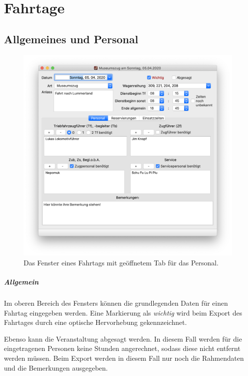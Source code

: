 \chapter{Fahrtage}\label{einsatz:fahrtag}
\section{Allgemeines und Personal}
\begin{figure}[!h]
	\includegraphics[width=\textwidth]{img/fahrtag_personal}
	\caption{Das Fenster eines Fahrtags mit geöffnetem Tab für das Personal.}
	\label{fig:einsatz:fahrtag:personal}
\end{figure}
\paragraph{Allgemein}
Im oberen Bereich des Fensters können die grundlegenden Daten für einen Fahrtag eingegeben werden.
Eine Markierung als \emph{wichtig} wird beim Export des Fahrtages durch eine optische Hervorhebung gekennzeichnet.
\begin{neu}
Ebenso kann die Veranstaltung abgesagt werden.
In diesem Fall werden für die eingetragenen Personen keine Stunden angerechnet, sodass diese nicht entfernt werden müssen.
Beim Export werden in diesem Fall nur noch die Rahmendaten und die Bemerkungen ausgegeben.
\end{neu}


